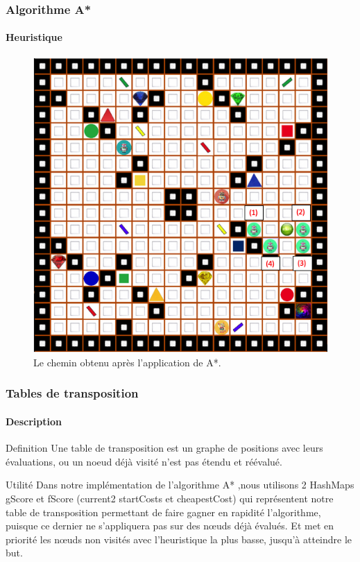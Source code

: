 \documentclass[t]{beamer}
\begin{document}
\begin{frame}
\frametitle{Algorithme A*}
\framesubtitle{Heuristique}
\begin{figure}[h!]
\centerline{\includegraphics[scale=0.33]{apres.PNG}}
\caption{Le chemin obtenu après l'application de A*.}
\end{figure}
\end{frame}



\begin{frame}
\frametitle{Tables de transposition}
\framesubtitle{Description}
\begin{block}{Definition}
Une table de transposition est un graphe de positions avec leurs évaluations, ou un noeud déjà visité n'est pas étendu et réévalué.
\end{block}
\begin{exampleblock}{Utilité } 
Dans notre implémentation de l'algorithme A* ,nous utilisons 2 HashMaps gScore et fScore (current2 startCosts et cheapestCost) qui représentent notre table de transposition permettant de faire gagner en rapidité l'algorithme, puisque ce dernier ne s'appliquera pas sur des nœuds déjà évalués. Et met en priorité les nœuds non visités avec l'heuristique la plus basse, jusqu'à atteindre le but.
\end{exampleblock}
\end{frame}
\end{document}
